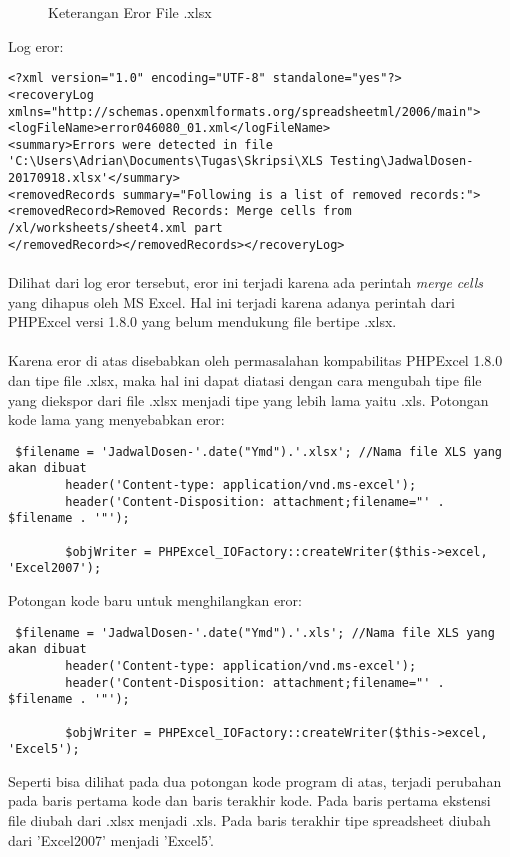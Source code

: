 \begin{figure} [H]
	\centering  
	\caption[Keterangan Eror File .xlsx]{Keterangan Eror File .xlsx} 
	\label{fig:flow-chart-CodeIgniter} 
\end{figure}

Log eror:
\begin{lstlisting}
<?xml version="1.0" encoding="UTF-8" standalone="yes"?>
<recoveryLog xmlns="http://schemas.openxmlformats.org/spreadsheetml/2006/main">
<logFileName>error046080_01.xml</logFileName>
<summary>Errors were detected in file 'C:\Users\Adrian\Documents\Tugas\Skripsi\XLS Testing\JadwalDosen-20170918.xlsx'</summary>
<removedRecords summary="Following is a list of removed records:"><removedRecord>Removed Records: Merge cells from /xl/worksheets/sheet4.xml part
</removedRecord></removedRecords></recoveryLog>
\end{lstlisting}
\paragraph{}Dilihat dari log eror tersebut, eror ini terjadi karena ada perintah \textit{merge cells} yang dihapus oleh MS Excel. Hal ini terjadi karena adanya perintah dari PHPExcel versi 1.8.0 yang belum mendukung file bertipe .xlsx.
\paragraph{}Karena eror di atas disebabkan oleh permasalahan kompabilitas PHPExcel 1.8.0 dan tipe file .xlsx, maka hal ini dapat diatasi dengan cara mengubah tipe file yang diekspor dari file .xlsx menjadi tipe yang lebih lama yaitu .xls.
\newline
\newline
Potongan kode lama yang menyebabkan eror:
\begin{lstlisting}
 $filename = 'JadwalDosen-'.date("Ymd").'.xlsx'; //Nama file XLS yang akan dibuat
        header('Content-type: application/vnd.ms-excel');
        header('Content-Disposition: attachment;filename="' . $filename . '"');

        $objWriter = PHPExcel_IOFactory::createWriter($this->excel, 'Excel2007');
\end{lstlisting}
Potongan kode baru untuk menghilangkan eror:
\begin{lstlisting}
 $filename = 'JadwalDosen-'.date("Ymd").'.xls'; //Nama file XLS yang akan dibuat
        header('Content-type: application/vnd.ms-excel');
        header('Content-Disposition: attachment;filename="' . $filename . '"');

        $objWriter = PHPExcel_IOFactory::createWriter($this->excel, 'Excel5');
\end{lstlisting}
Seperti bisa dilihat pada dua potongan kode program di atas, terjadi perubahan pada baris pertama kode dan baris terakhir kode. Pada baris pertama ekstensi file diubah dari .xlsx menjadi .xls. Pada baris terakhir tipe spreadsheet diubah dari 'Excel2007' menjadi 'Excel5'.
